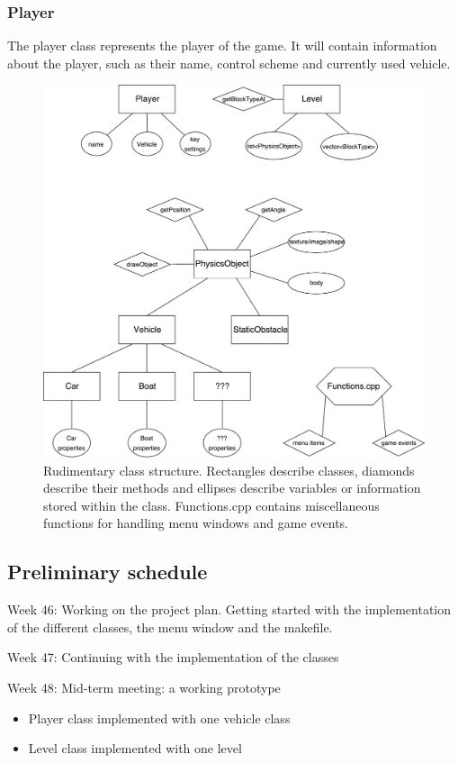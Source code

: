 \documentclass{article}
\begin{document}
\subsubsection*{Player}
The player class represents the player of the game. It will contain information about the player, such as their name, control scheme and currently used vehicle.

\begin{figure}[!ht]
\centering
\includegraphics[width=\textwidth]{classes.pdf}
\caption{Rudimentary class structure. Rectangles describe classes, diamonds describe their methods and ellipses describe variables or information stored within the class. Functions.cpp contains miscellaneous functions for handling menu windows and game events.}
\end{figure}

\subsection*{Preliminary schedule}
Week 46: Working on the project plan. Getting started with the implementation of the different classes, the menu window and the makefile.

Week 47: Continuing with the implementation of the classes

Week 48: Mid-term meeting: a working prototype
\begin{itemize}
\item Player class implemented with one vehicle class
\item Level class implemented with one level
\end{itemize}
\end{document}
